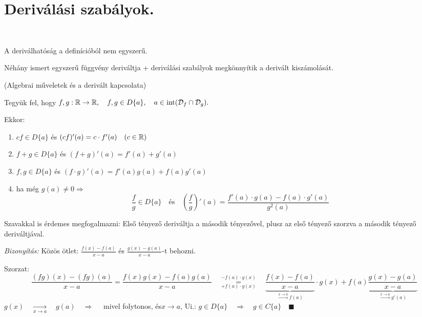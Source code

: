 \documentclass[a4paper,11.5pt]{article}
\begin{document}
	\section{Deriválási szabályok.}
	\begin{note}\
		
		\begin{compactitem}
			\item A deriválhatóság a definícióból nem egyszerű.
			\item Néhány ismert egyszerű függvény deriváltja + deriválási szabályok megkönnyítik a derivált kiszámolását.
		\end{compactitem}
	\end{note}
	\begin{theorem}
		(Algebrai műveletek és a derivált kapcsolata)
		
		Tegyük fel, hogy $f,g:\mathbb{R}\to\mathbb{R}, \quad f,g\in D\{a\},\quad a\in \text{int}(\mathcal{D}_f\cap\mathcal{D}_g).$
		
		Ekkor:
		\begin{enumerate}
			\item $cf\in D\{a\}$ és $(cf)'(a)=c\cdot f'(a)\quad (c\in\mathbb{R})$
			\item $f+g\in D\{a\}$ és $(f+g)'(a)=f'(a)+g'(a)$
			\item $f,g\in D\{a\}$ és $(f\cdot g)'(a)=f'(a)g(a)+f(a)g'(a)$
			\item ha még $g(a)\not=0\Rightarrow$
			\[ \frac{f}{g}\in D\{a\}\quad \text{és}\quad \left(\frac{f}{g}\right)'(a)=\frac{f'(a)\cdot g(a)-f(a)\cdot g'(a)}{g^2(a)} \]
		\end{enumerate}
		\begin{note}
			Szavakkal is érdemes megfogalmazni: Első tényező deriváltja a második tényezővel, plusz az első tényező szorzva a második tényező deriváltjával.
		\end{note}
		\textit{Bizonyítás:} Közös ötlet: $\displaystyle \frac{f(x)-f(a)}{x-a}$ és $\displaystyle \frac{g(x)-g(a)}{x-a}$-t behozni.
		
		 Szorzat:
		\[ \frac{(fg)(x)-(fg)(a)}{x-a}=\frac{f(x)g(x)-f(a)g(a)}{x-a}\quad \overset{-f(a)\cdot g(x)}{\underset{+f(a)\cdot g(x)}{=}}\quad \underbrace{\frac{f(x)-f(a)}{x-a}}_{\overset{x\to a}{\longrightarrow}f(a)}\cdot g(x)+f(a)\underbrace{\frac{g(x)-g(a)}{x-a}}_{\overset{x\to a}{\longrightarrow}g'(a)} \]
		$g(x)\quad \underset{x\to a}{\longrightarrow}\quad g(a)\quad \Rightarrow\quad $ mivel folytonos, és\quad  $x\to a$, Ui.: $g\in D\{a\}\quad \Rightarrow\quad  g\in C\{a\}\quad \blacksquare$
		

\end{theorem}
\end{document}
